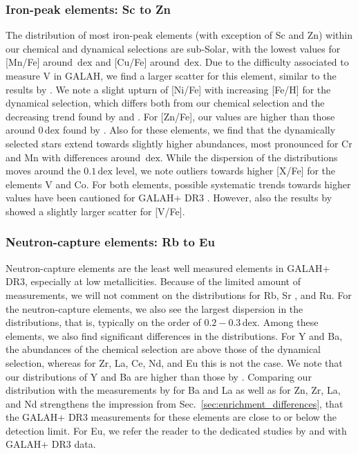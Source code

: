 \documentclass[fleqn,usenatbib]{mnras}
\newcommand{\dex}{\,\mathrm{dex}}	%
\begin{document}
\subsubsection{Iron-peak elements: Sc to Zn} \label{sec:chronochemodynamics_ironpeak}

The distribution of most iron-peak elements (with exception of Sc and Zn) within our chemical and dynamical selections are sub-Solar, with the lowest values for [Mn/Fe] around $\dex$ and [Cu/Fe] around $\dex$. Due to the difficulty associated to measure V in GALAH, we find a larger scatter for this element, similar to the results by \citep{Hawkins2015}. We note a slight upturn of [Ni/Fe] with increasing [Fe/H] for the dynamical selection, which differs both from our chemical selection and the decreasing trend found by \citet{Nissen2010} and \citet{Hawkins2015}. For [Zn/Fe], our values are higher than those around $0\dex$ found by \citet{Nissen2011}. Also for these elements, we find that the dynamically selected stars extend towards slightly higher abundances, most pronounced for Cr and Mn with differences around $\dex$. While the dispersion of the distributions moves around the $0.1\dex$ level, we note outliers towards higher [X/Fe] for the elements V and Co. For both elements, possible systematic trends towards higher values have been cautioned for GALAH+ DR3 \citep{Buder2021}. However, also the results by \citet{Hawkins2015} showed a slightly larger scatter for [V/Fe].

\subsubsection{Neutron-capture elements: Rb to Eu}

Neutron-capture elements are the least well measured elements in GALAH+ DR3, especially at low metallicities. Because of the limited amount of measurements, we will not comment on the distributions for Rb, Sr \citep[see however][]{Aguado2021}, and Ru.
For the neutron-capture elements, we also see the largest dispersion in the distributions, that is, typically on the order of $0.2-0.3\dex$. Among these elements, we also find significant differences in the distributions. For Y and Ba, the abundances of the chemical selection are above those of the dynamical selection, whereas for Zr, La, Ce, Nd, and Eu this is not the case. We note that our distributions \citep[see also][]{Aguado2021} of Y and Ba are higher than those by \citet{Nissen2011}. Comparing our distribution with the measurements by \citet{Venn2004} for Ba and La as well as \citet{Fishlock2017} for Zn, Zr, La, and Nd strengthens the impression from Sec.~\ref{sec:enrichment_differences}, that the GALAH+ DR3 measurements for these elements are close to or below the detection limit. For Eu, we  refer the reader to the dedicated studies by \citet{Matsuno2021} and \citet{Aguado2021} with GALAH+ DR3 data.
\end{document}
